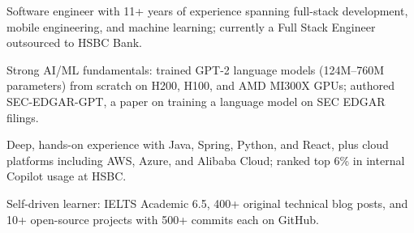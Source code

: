 

\begin{cventry}
    {} %
    {} %
    {} %
    {} %
    {
        \begin{cvitems}
            \item {Software engineer with 11+ years of experience spanning full-stack development, mobile engineering, and machine learning; currently a Full Stack Engineer outsourced to HSBC Bank.}
            \item {Strong AI/ML fundamentals: trained GPT-2 language models (124M--760M parameters) from scratch on H200, H100, and AMD MI300X GPUs; authored SEC-EDGAR-GPT, a paper on training a language model on SEC EDGAR filings.}
            \item {Deep, hands-on experience with Java, Spring, Python, and React, plus cloud platforms including AWS, Azure, and Alibaba Cloud; ranked top 6\% in internal Copilot usage at HSBC.}
            \item {Self-driven learner: IELTS Academic 6.5, 400+ original technical blog posts, and 10+ open-source projects with 500+ commits each on GitHub.}
        \end{cvitems}
    }
\end{cventry}
